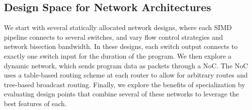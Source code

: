 



\subsection{Design Space for Network Architectures} \label{sec:network}

We start with several statically allocated network designs, where each SIMD pipeline connects to several switches, and vary flow control strategies and network bisection bandwidth.
In these designs, each switch output connects to exactly one switch input for the duration of the program.
We then explore a dynamic network, which sends program data as packets through a NoC.
The NoC uses a table-based routing scheme at each router to allow for arbitrary routes and tree-based broadcast routing.
Finally, we explore the benefits of specialization by evaluating design points that combine several of these networks to leverage the best features of each.

